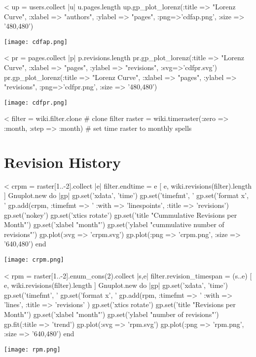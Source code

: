 \documentclass{scrartcl}
\begin{document}
<%
up = users.collect { |u| u.pages.length }
up.gp_plot_lorenz(:title => "Lorenz Curve", :xlabel => "authors", :ylabel => "pages", :png=>'cdfap.png', :size => '480,480')
\begin{center}
  \texttt{[image: cdfap.png]}
\end{center}

<%
pr = pages.collect { |p| p.revisions.length }
pr.gp_plot_lorenz(:title => "Lorenz Curve", :xlabel => "pages", :ylabel => "revisions", :svg=>'cdfpr.svg')
pr.gp_plot_lorenz(:title => "Lorenz Curve", :xlabel => "pages", :ylabel => "revisions", :png=>'cdfpr.png', :size => '480,480')
\begin{center}
  \texttt{[image: cdfpr.png]}
\end{center}



<%
filter = wiki.filter.clone # clone filter
raster = wiki.timeraster(:zero => :month, :step => :month) # set time raster to monthly spells

\section{Revision History} %
\label{sec:revision_history}

<%
crpm = raster[1..-2].collect { |e| filter.endtime = e 
	[ e, wiki.revisions(filter).length ]
	}
Gnuplot.new do |gp|
	gp.set('xdata', 'time')
	gp.set('timefmt', '%
	gp.set('format x', '%
	gp.add(crpm, :timefmt => '%
		:with => 'linespoints', 
		:title => 'revisions')
	gp.set('nokey')
	gp.set('xtics rotate')
	gp.set('title "Cummulative Revisions per Month"')
	gp.set('xlabel "month"')
	gp.set('ylabel "cummulative number of revisions"')
	gp.plot(:svg => 'crpm.svg')
	gp.plot(:png => 'crpm.png', :size => '640,480')
end
\begin{center}
  \texttt{[image: crpm.png]}
\end{center}

<%
rpm = raster[1..-2].enum_cons(2).collect { |s,e| 
	filter.revision_timespan = (s..e)
	[ e, wiki.revisions(filter).length ]
	}
Gnuplot.new do |gp|
	gp.set('xdata', 'time')
	gp.set('timefmt', '%
	gp.set('format x', '%
	gp.add(rpm, :timefmt => '%
		:with => 'lines', 
		:title => 'revisions' )
	gp.set('xtics rotate')
	gp.set('title "Revisions per Month"')
	gp.set('xlabel "month"')
	gp.set('ylabel "number of revisions"')
	gp.fit(:title => 'trend')
	gp.plot(:svg => 'rpm.svg')
	gp.plot(:png => 'rpm.png', :size => '640,480')
end
\begin{center}
  \texttt{[image: rpm.png]}
\end{center}
\end{document}
